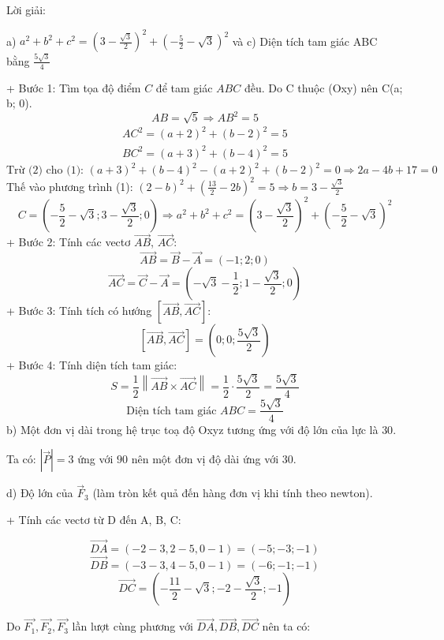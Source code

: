 \documentclass[a4paper,12pt]{article}
\begin{document}
Lời giải:

a) \(a^2+b^2+c^2=\left(3 - \frac{\sqrt{3}}{2}\right)^{2} + \left(- \frac{5}{2} - \sqrt{3}\right)^{2}\) và c) Diện tích tam giác ABC bằng \(\frac{5 \sqrt{3}}{4}\)

+ Bước 1: Tìm tọa độ điểm \(C\) để tam giác \(ABC\) đều.
Do C thuộc (Oxy) nên C(a; b; 0).
\[ AB = \sqrt{5} \Rightarrow AB^2 = 5 \]
\begin{align}
AC^2 = (a +2)^2 + (b - 2)^2 = 5 \tag{1} \\
BC^2 = (a +3)^2 + (b - 4)^2 = 5 \tag{2}
\end{align}
\[\text{Trừ (2) cho (1): }(a + 3)^2 + (b - 4)^2 - (a + 2)^2 + (b - 2)^2 = 0 \Rightarrow 2 a - 4 b + 17 = 0\]
Thế vào phương trình (1): \(\left(2 - b\right)^{2} + \left(\frac{13}{2} - 2 b\right)^{2} = 5 \Rightarrow b=3 - \frac{\sqrt{3}}{2}\)
\[C = (- \frac{5}{2} - \sqrt{3}; 3 - \frac{\sqrt{3}}{2}; 0) \Rightarrow a^2+b^2+c^2=\left(3 - \frac{\sqrt{3}}{2}\right)^{2} + \left(- \frac{5}{2} - \sqrt{3}\right)^{2}\]
+ Bước 2: Tính các vectơ \(\overrightarrow{AB}\), \(\overrightarrow{AC}\):
\[ \overrightarrow{AB} = \overrightarrow{B} - \overrightarrow{A} = (-1; 2; 0) \]
\[ \overrightarrow{AC} = \overrightarrow{C} - \overrightarrow{A} = (- \sqrt{3} - \frac{1}{2}; 1 - \frac{\sqrt{3}}{2}; 0) \]
+ Bước 3: Tính tích có hướng \(\left[\overrightarrow{AB}, \overrightarrow{AC}\right]\):
\[ [\overrightarrow{AB},  \overrightarrow{AC}] = (0; 0; \frac{5 \sqrt{3}}{2}) \]
+ Bước 4: Tính diện tích tam giác:
\[
S = \frac{1}{2} \left\| \overrightarrow{AB} \times \overrightarrow{AC} \right\| = \frac{1}{2} \cdot \frac{5 \sqrt{3}}{2}
= \frac{5 \sqrt{3}}{4}
\]
\[\text{Diện tích tam giác } ABC = \frac{5 \sqrt{3}}{4}\]
b) Một đơn vị dài trong hệ trục toạ độ Oxyz tương ứng với độ lớn của lực là \(30\).


Ta có: \(|\overrightarrow{P}| = 3\) ứng với \(90\) nên một đơn vị độ dài ứng với \(30\).




d) Độ lớn của \(\overrightarrow{F}_3\) (làm tròn kết quả đến hàng đơn vị khi tính theo newton).


+ Tính các vectơ từ D đến A, B, C:


\[ \overrightarrow{DA} = (-2 - 3, 2 - 5, 0 - 1) = (-5; -3; -1) \]
\[ \overrightarrow{DB} = (-3 - 3, 4 - 5, 0 - 1) = (-6; -1; -1) \]
\[ \overrightarrow{DC} = (- \frac{11}{2} - \sqrt{3}; -2 - \frac{\sqrt{3}}{2}; -1) \]


Do \(\overrightarrow{F_1},\overrightarrow{F_2}, \overrightarrow{F_3}\) lần lượt cùng phương với \(\overrightarrow{DA}, \overrightarrow{DB}, \overrightarrow{DC}\) nên ta có:
\end{document}
